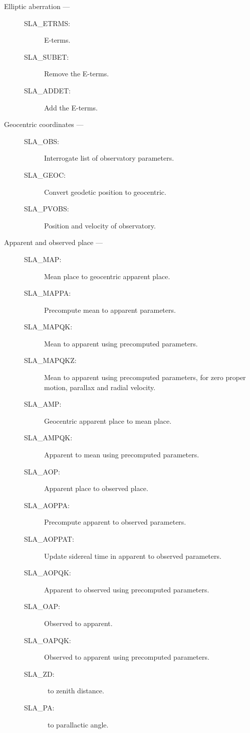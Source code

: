 \begin{description}
\item [Elliptic aberration ---]

\begin{description}
\item [SLA\_ETRMS:]  E-terms.
\item [SLA\_SUBET:]  Remove the E-terms.
\item [SLA\_ADDET:]  Add the E-terms.
\end{description}

\item [Geocentric coordinates ---]

\begin{description}
\item [SLA\_OBS:]  Interrogate list of observatory parameters.
\item [SLA\_GEOC:]  Convert geodetic position to geocentric.
\item [SLA\_PVOBS:]  Position and velocity of observatory.
\end{description}

\item [Apparent and observed place ---]

\begin{description}
\item [SLA\_MAP:]  Mean place to geocentric apparent place.
\item [SLA\_MAPPA:]  Precompute mean to apparent parameters.
\item [SLA\_MAPQK:]  Mean to apparent using precomputed parameters.
\item [SLA\_MAPQKZ:]  Mean to apparent using precomputed parameters, for zero proper motion, parallax and radial velocity.
\item [SLA\_AMP:]  Geocentric apparent place to mean place.
\item [SLA\_AMPQK:]  Apparent to mean using precomputed parameters.
\item [SLA\_AOP:]  Apparent place to observed place.
\item [SLA\_AOPPA:]  Precompute apparent to observed parameters.
\item [SLA\_AOPPAT:]  Update sidereal time in apparent to observed parameters.
\item [SLA\_AOPQK:]  Apparent to observed using precomputed parameters.
\item [SLA\_OAP:]  Observed to apparent.
\item [SLA\_OAPQK:]  Observed to apparent using precomputed parameters.
\item [SLA\_ZD:]  \hadec\ to zenith distance.
\item [SLA\_PA:]  \hadec\ to parallactic angle.
\end{description}


\end{description}
